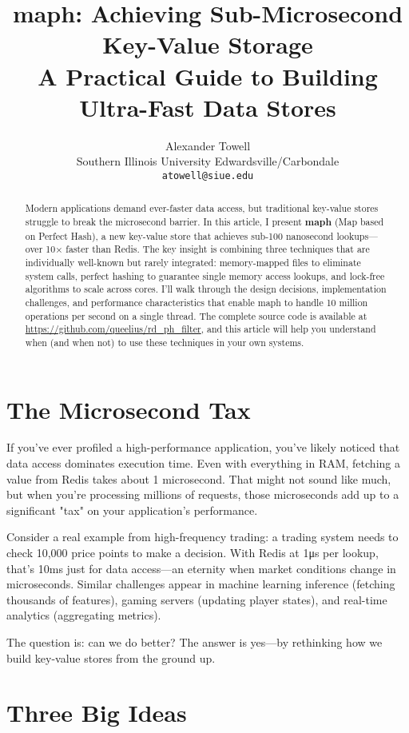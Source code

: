\documentclass[11pt]{article}
\title{maph: Achieving Sub-Microsecond Key-Value Storage\\
\large A Practical Guide to Building Ultra-Fast Data Stores}
\author{
Alexander Towell\\
Southern Illinois University Edwardsville/Carbondale\\
\texttt{atowell@siue.edu}
}
\date{}
\begin{document}
\maketitle

\begin{abstract}
\noindent
Modern applications demand ever-faster data access, but traditional key-value stores struggle to break the microsecond barrier. In this article, I present \textbf{maph} (Map based on Perfect Hash), a new key-value store that achieves sub-100 nanosecond lookups—over 10× faster than Redis. The key insight is combining three techniques that are individually well-known but rarely integrated: memory-mapped files to eliminate system calls, perfect hashing to guarantee single memory access lookups, and lock-free algorithms to scale across cores. I'll walk through the design decisions, implementation challenges, and performance characteristics that enable maph to handle 10 million operations per second on a single thread. The complete source code is available at \url{https://github.com/queelius/rd_ph_filter}, and this article will help you understand when (and when not) to use these techniques in your own systems.
\end{abstract}

\section{The Microsecond Tax}

If you've ever profiled a high-performance application, you've likely noticed that data access dominates execution time. Even with everything in RAM, fetching a value from Redis takes about 1 microsecond. That might not sound like much, but when you're processing millions of requests, those microseconds add up to a significant "tax" on your application's performance.

Consider a real example from high-frequency trading: a trading system needs to check 10,000 price points to make a decision. With Redis at 1μs per lookup, that's 10ms just for data access—an eternity when market conditions change in microseconds. Similar challenges appear in machine learning inference (fetching thousands of features), gaming servers (updating player states), and real-time analytics (aggregating metrics).

The question is: can we do better? The answer is yes—by rethinking how we build key-value stores from the ground up.

\section{Three Big Ideas}
\end{document}

